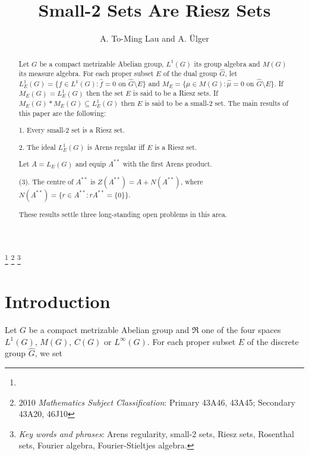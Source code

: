 \documentclass[12pt, twoside, leqno]{article}
\theoremstyle{definition}
\theoremstyle{definition}
\numberwithin{equation}{section}
\begin{document}
	\title{Small-2 Sets Are Riesz Sets }

\author{ A. To-Ming Lau and A. Ülger}
\maketitle
\thispagestyle{empty}


\renewcommand{\thefootnote}{}
\footnote{}
\footnote{2010 \emph{Mathematics Subject Classification}:
	Primary 43A46, 43A45; Secondary 43A20, 46J10}
\footnote{\emph{Key words and phrases}: Arens regularity, small-2 sets, Riesz sets, Rosenthal sets, Fourier algebra, Fourier-Stieltjes algebra.} 
	\begin{abstract}
		Let $ G $ be a compact metrizable Abelian group, $ L^{1}(G) $ its group algebra and $ M(G) $ its measure algebra. For each proper subset $ E $ of the dual group $ \hat{G} $, let $ L^{1}_{E}(G)=\{f\in L^{1}(G):\hat{f}=0 \text{ on } \hat{G}\setminus E \}$ and $M_{E}=\{\mu\in M(G):\hat{\mu}=0 \text{ on }\hat{G}\setminus E\} $. If $ M_{E}(G)=L^{1}_{E}(G) $ then the set $ E $ is said to be a Riesz sets. If $ M_{E}(G)*M_{E}(G)\subseteq L_{E}^{1}(G) $ then $ E $ is said to be a small-2 set. The main results of this paper are the following:\vspace{2mm}
		
		1. Every small-2 set is a Riesz set.\vspace{2mm}
		
		2. The ideal  $ L^{1}_{E}(G) $ is Arens regular iff $ E $ is a Riesz set.\vspace{2mm}
		
	\noindent	Let $ A=L_{E}(G) $ and equip $ A^{**} $ with the first Arens product.\vspace{2mm} 
		
		(3). The centre of $ A^{**} $ is $ Z(A^{**})=A+N(A^{**}) $, where $ N(A^{**})=\{r\in A^{**}:rA^{**}=\{0\}\} $.\vspace{2mm}
		
	\noindent These results settle three long-standing open problems in this area. 
	\end{abstract}
\section{Introduction} Let $ G $ be a compact metrizable Abelian group and $ \Re $ one of the four spaces $ L^{1}(G) $, $ M(G) $, $ C(G) $ or $ L^{\infty}(G) $. For each proper subset $ E $ of the discrete group $ \hat{G} $, we set\vspace{2mm}
\end{document}
